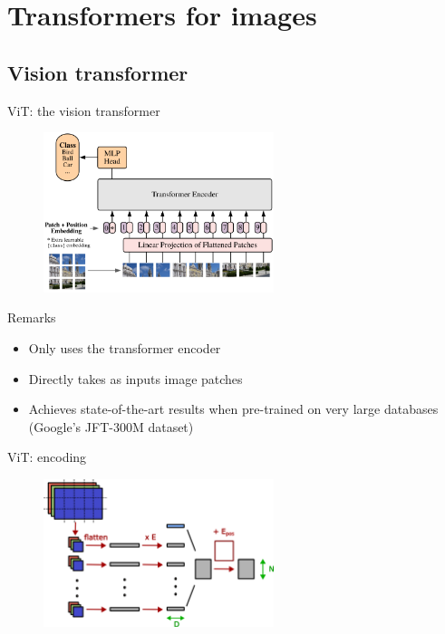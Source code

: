 \documentclass[xcolor=pdftex,dvipsnames,table,mathserif]{beamer}
\begin{document}
\section{Transformers for images}

\subsection{Vision transformer}


\begin{frame}{ViT: the vision transformer~\cite{dosovitskiy_image_2021}}

\begin{figure}[ht]
  \centering
  \includegraphics[width=0.6\textwidth]{vision_transformer}
\end{figure}

\begin{block}{Remarks}
  \begin{itemize}
  \item Only uses the transformer encoder
  \item Directly takes as inputs image patches
  \item Achieves state-of-the-art results when pre-trained on very large databases (Google's JFT-300M dataset)
  \end{itemize}
\end{block}


\end{frame}


\begin{frame}{ViT: encoding}

\begin{figure}[ht]
  \centering
  \includegraphics[width=0.6\textwidth]{vit_illustration1}
\end{figure}


\end{frame}
\end{document}
